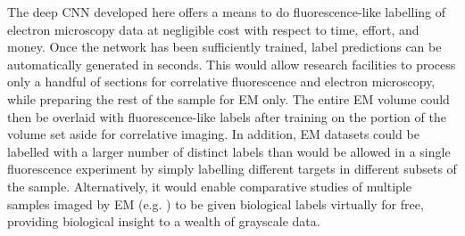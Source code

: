 The deep CNN developed here offers a means to do fluorescence-like labelling of electron microscopy data at negligible cost with respect to time, effort, and money. Once the network has been sufficiently trained, label predictions can be automatically generated in seconds. This would allow research facilities to process only a handful of sections for correlative fluorescence and electron microscopy, while preparing the rest of the sample for EM only. The entire EM volume could then be overlaid with fluorescence-like labels after training on the portion of the volume set aside for correlative imaging. In addition, EM datasets could be labelled with a larger number of distinct labels than would be allowed in a single fluorescence experiment by simply labelling different targets in different subsets of the sample.  Alternatively, it would enable comparative studies of multiple samples imaged by EM (e.g. \cite{de2020large} \needref) to be given biological labels virtually for free, providing biological insight to a wealth of grayscale data. 
